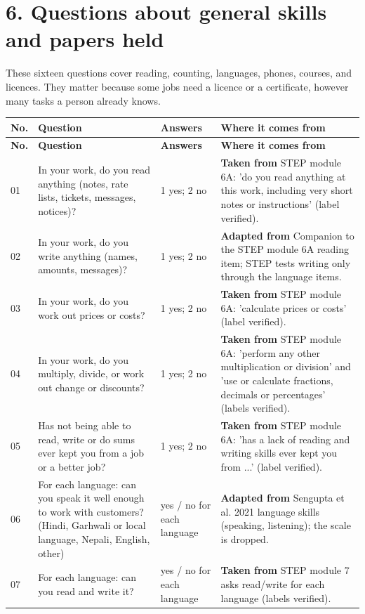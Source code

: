 \documentclass[11pt]{article}
\begin{document}
\section*{6. Questions about general skills and papers held}
These sixteen questions cover reading, counting, languages, phones, courses, and licences.
They matter because some jobs need a licence or a certificate, however many tasks a person already knows.
{\footnotesize
\begin{longtable}{p{0.7cm}p{4.5cm}p{2.8cm}p{6.6cm}}
\toprule
\textbf{No.} & \textbf{Question} & \textbf{Answers} & \textbf{Where it comes from} \\
\midrule
\endfirsthead
\toprule
\textbf{No.} & \textbf{Question} & \textbf{Answers} & \textbf{Where it comes from} \\
\midrule
\endhead
01 & In your work, do you read anything (notes, rate lists, tickets, messages, notices)? & 1 yes; 2 no & \textbf{Taken from} STEP module 6A: 'do you read anything at this work, including very short notes or instructions' (label verified). \\
02 & In your work, do you write anything (names, amounts, messages)? & 1 yes; 2 no & \textbf{Adapted from} Companion to the STEP module 6A reading item; STEP tests writing only through the language items. \\
03 & In your work, do you work out prices or costs? & 1 yes; 2 no & \textbf{Taken from} STEP module 6A: 'calculate prices or costs' (label verified). \\
04 & In your work, do you multiply, divide, or work out change or discounts? & 1 yes; 2 no & \textbf{Taken from} STEP module 6A: 'perform any other multiplication or division' and 'use or calculate fractions, decimals or percentages' (labels verified). \\
05 & Has not being able to read, write or do sums ever kept you from a job or a better job? & 1 yes; 2 no & \textbf{Taken from} STEP module 6A: 'has a lack of reading and writing skills ever kept you from ...' (label verified). \\
06 & For each language: can you speak it well enough to work with customers? (Hindi, Garhwali or local language, Nepali, English, other) & yes / no for each language & \textbf{Adapted from} Sengupta et al. 2021 language skills (speaking, listening); the scale is dropped. \\
07 & For each language: can you read and write it? & yes / no for each language & \textbf{Taken from} STEP module 7 asks read/write for each language (labels verified). \\

\end{longtable}}
\end{document}
